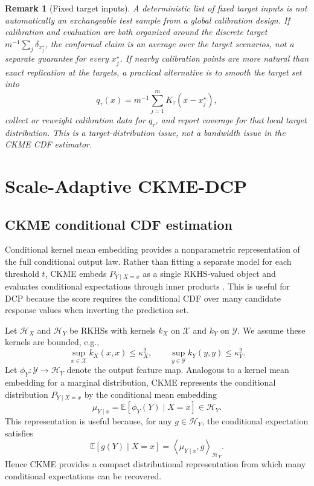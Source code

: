 \documentclass[11pt]{article}
\newtheorem{remark}{Remark}
\newcommand{\Xcal}{\mathcal X}
\newcommand{\Ycal}{\mathcal Y}
\newcommand{\Hcal}{\mathcal H}
\newcommand{\E}{\mathbb E}
\newcommand{\inner}[2]{\left\langle #1,#2 \right\rangle}
\begin{document}
\begin{remark}[Fixed target inputs]
A deterministic list of fixed target inputs is not automatically an exchangeable test sample from a global calibration design. If calibration and evaluation are both organized around the discrete target \(m^{-1}\sum_j\delta_{x_j^\star}\), the conformal claim is an average over the target scenarios, not a separate guarantee for every \(x_j^\star\). If nearby calibration points are more natural than exact replication at the targets, a practical alternative is to smooth the target set into
\[
  q_\tau(x)=m^{-1}\sum_{j=1}^m K_\tau(x-x_j^\star),
\]
collect or reweight calibration data for \(q_\tau\), and report coverage for that local target distribution. This is a target-distribution issue, not a bandwidth issue in the CKME CDF estimator.
\end{remark}

\section{Scale-Adaptive CKME-DCP}
\label{sec:method}

\subsection{CKME conditional CDF estimation}

Conditional kernel mean embedding provides a nonparametric representation of the full conditional output law. Rather than fitting a separate model for each threshold \(t\), CKME embeds \(P_{Y\mid X=x}\) as a single RKHS-valued object and evaluates conditional expectations through inner products \cite{song2013,muandet2017}. This is useful for DCP because the score requires the conditional CDF over many candidate response values when inverting the prediction set.

Let \(\Hcal_X\) and \(\Hcal_Y\) be RKHSs with kernels \(k_X\) on \(\Xcal\) and \(k_Y\) on \(\Ycal\). We assume these kernels are bounded, e.g.,
\[
  \sup_{x\in\Xcal}k_X(x,x)\le \kappa_X^2,
  \qquad
  \sup_{y\in\Ycal}k_Y(y,y)\le \kappa_Y^2.
\]
Let \(\phi_Y:\Ycal\to\Hcal_Y\) denote the output feature map. Analogous to a kernel mean embedding for a marginal distribution, CKME represents the conditional distribution \(P_{Y\mid X=x}\) by the conditional mean embedding
\[
  \mu_{Y\mid x}=\E[\phi_Y(Y)\mid X=x]\in \Hcal_Y.
\]
This representation is useful because, for any \(g\in\Hcal_Y\), the conditional expectation satisfies
\[
  \E[g(Y)\mid X=x]=\inner{\mu_{Y\mid x}}{g}_{\Hcal_Y}.
\]
Hence CKME provides a compact distributional representation from which many conditional expectations can be recovered.
\end{document}
